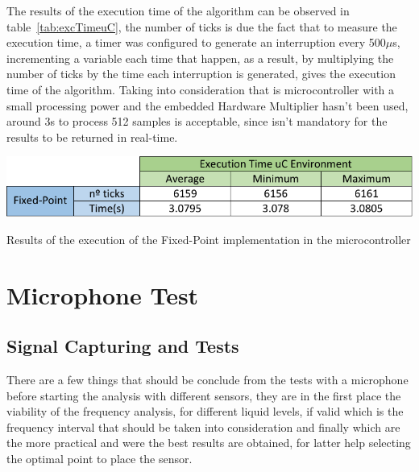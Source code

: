 The results of the execution time of the algorithm can be observed in table~\ref{tab:excTimeuC}, the number of ticks is due the fact that to measure the execution time, a timer was configured to generate an interruption every 500$\mu$s, incrementing a variable each time that happen, as a result, by multiplying the number of ticks by the time each interruption is generated, gives the execution time of the algorithm. Taking into consideration that is microcontroller with a small processing power and the embedded Hardware Multiplier hasn't been used, around 3s to process 512 samples is acceptable, since isn't mandatory for the results to be returned in real-time.  
\begin{table}
    \centering
    \includegraphics[width=1\textwidth]{Chapters/6CHP/Figures/excTimeuC.pdf}
    \caption{Results of the execution of the Fixed-Point implementation in the microcontroller}
    \label{tab:excTimeuC}
\end{table}
\section{Microphone Test}
\subsection{Signal Capturing and Tests}
There are a few things that should be conclude from the tests with a microphone before starting the analysis with different sensors, they are in the first place the viability of the frequency analysis, for different liquid levels, if valid which is the frequency interval that should be taken into consideration and finally which are the more practical and were the best results are obtained, for latter help selecting the optimal point to place the sensor. 

